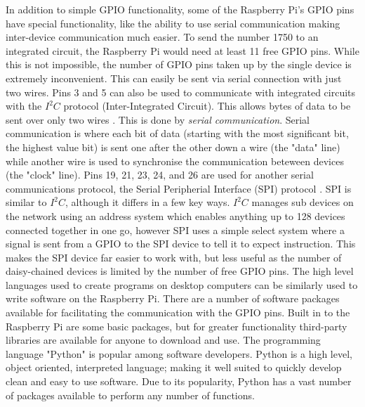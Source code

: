 \documentclass[twoside,a4]{report}
\def\br{\newline \newline \noindent}
\begin{document}
	In addition to simple GPIO functionality, some of the Raspberry Pi's GPIO pins have special functionality, like the ability to use serial communication making inter-device communication much easier. To send the number 1750 to an integrated circuit, the Raspberry Pi would need at least 11 free GPIO pins. While this is not impossible, the number of GPIO pins taken up by the single device is extremely inconvenient. This can easily be sent via serial connection with just two wires. Pins 3 and 5 can also be used to communicate with integrated circuits with the \(I^2 C\) protocol (Inter-Integrated Circuit). This allows bytes of data to be sent over only two wires \cite{backwhatisi2c}. This is done by \textit{serial communication}. Serial communication is where each bit of data (starting with the most significant bit, the highest value bit) is sent one after the other down a wire (the "data" line) \cite{backwhatisserpar} while another wire is used to synchronise the communication beteween devices (the "clock" line). Pins 19, 21, 23, 24, and 26 are used for another serial communications protocol, the Serial Peripherial Interface (SPI) protocol \cite{backwhatisspi}. SPI is similar to \(I^2 C\), although it differs in a few key ways.  \(I^2 C\) manages sub devices on the network using an address system which enables anything up to 128 devices connected together in one go, however SPI uses a simple select system where a signal is sent from a GPIO to the SPI device to tell it to expect instruction. This makes the SPI device far easier to work with, but less useful as the number of daisy-chained devices is limited by the number of free GPIO pins. \br
	The high level languages used to create programs on desktop computers can be similarly used to write software on the Raspberry Pi. There are a number of software packages available for facilitating the communication with the GPIO pins. Built in to the Raspberry Pi are some basic packages, but for greater functionality third-party libraries are available for anyone to download and use\cite{pilibswiringpi, pilibspigpio}. The programming language "Python" is popular among software developers. Python is a high level, object oriented, interpreted language; making it well suited to quickly develop clean and easy to use software. Due to its popularity, Python has a vast number of packages available to perform any number of functions.
	
\end{document}
